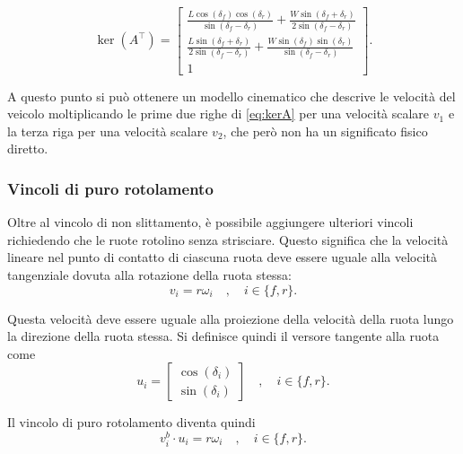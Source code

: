 \begin{equation}
    \label{eq:kerA}
    \ker(A^\top)=\begin{bmatrix}\frac{L \cos{\left(\delta_{f}{} \right)} \cos{\left(\delta_{r}{} \right)}}{\sin{\left(\delta_{f}{} - \delta_{r}{} \right)}} + \frac{W \sin{\left(\delta_{f}{} + \delta_{r}{} \right)}}{2 \sin{\left(\delta_{f}{} - \delta_{r}{} \right)}}\\\frac{L \sin{\left(\delta_{f}{} + \delta_{r}{} \right)}}{2 \sin{\left(\delta_{f}{} - \delta_{r}{} \right)}} + \frac{W \sin{\left(\delta_{f}{} \right)} \sin{\left(\delta_{r}{} \right)}}{\sin{\left(\delta_{f}{} - \delta_{r}{} \right)}}\\1\end{bmatrix}.
\end{equation}

A questo punto si può ottenere un modello cinematico che descrive le velocità del veicolo moltiplicando le prime due righe di \cref{eq:kerA} per una velocità scalare $v_1$ e la terza riga per una velocità scalare $v_2$, che però non ha un significato fisico diretto.

\subsubsection{Vincoli di puro rotolamento}
Oltre al vincolo di non slittamento, è possibile aggiungere ulteriori vincoli richiedendo che le ruote rotolino senza strisciare. Questo significa che la velocità lineare nel punto di contatto di ciascuna ruota deve essere uguale alla velocità tangenziale dovuta alla rotazione della ruota stessa:
\begin{equation}\label{eq:rolling_constraint}
    v_i = r \omega_i \quad , \quad i \in \{f,r\}.
\end{equation}

Questa velocità deve essere uguale alla proiezione della velocità della ruota lungo la direzione della ruota stessa. Si definisce quindi il versore tangente alla ruota come
\begin{equation}\label{eq:tangent_versor}
    u_i = \begin{bmatrix}
        \cos(\delta_i) \\
        \sin(\delta_i)
    \end{bmatrix} \quad , \quad i \in \{f,r\}.
\end{equation}

Il vincolo di puro rotolamento diventa quindi
\begin{equation}\label{eq:rolling_general}
    v_i^b \cdot u_i = r \omega_i \quad , \quad i \in \{f,r\}.
\end{equation}

